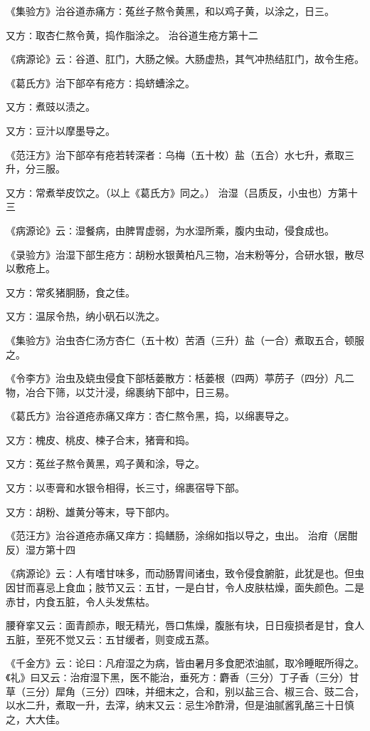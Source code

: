 \documentclass[a4paper,12pt,UTF8,twoside]{ctexbook}
\begin{document}
《集验方》治谷道赤痛方∶菟丝子熬令黄黑，和以鸡子黄，以涂之，日三。

又方∶取杏仁熬令黄，捣作脂涂之。
治谷道生疮方第十二

《病源论》云∶谷道、肛门，大肠之候。大肠虚热，其气冲热结肛门，故令生疮。

《葛氏方》治下部卒有疮方∶捣蛴螬涂之。

又方∶煮豉以渍之。

又方∶豆汁以摩墨导之。

《范汪方》治下部卒有疮若转深者∶乌梅（五十枚）盐（五合）水七升，煮取三升，分三服。

又方∶常煮举皮饮之。（以上《葛氏方》同之。）
治湿（吕质反，小虫也）方第十三

《病源论》云∶湿餐病，由脾胃虚弱，为水湿所乘，腹内虫动，侵食成也。

《录验方》治湿下部生疮方∶胡粉水银黄柏凡三物，冶末粉等分，合研水银，散尽以敷疮上。

又方∶常炙猪胴肠，食之佳。

又方∶温尿令热，纳小矾石以洗之。

《集验方》治虫杏仁汤方杏仁（五十枚）苦酒（三升）盐（一合）煮取五合，顿服之。

《令李方》治虫及蛲虫侵食下部栝蒌散方∶栝蒌根（四两）葶苈子（四分）凡二物，冶合下筛，以艾汁浸，绵裹纳下部中，日三易。

《葛氏方》治谷道疮赤痛又痒方∶杏仁熬令黑，捣，以绵裹导之。

又方∶槐皮、桃皮、楝子合末，猪膏和捣。

又方∶菟丝子熬令黄黑，鸡子黄和涂，导之。

又方∶以枣膏和水银令相得，长三寸，绵裹宿导下部。

又方∶胡粉、雄黄分等末，导下部内。

《范汪方》治谷道疮赤痛又痒方∶捣鳝肠，涂绵如指以导之，虫出。
治疳（居酣反）湿方第十四

《病源论》云∶人有嗜甘味多，而动肠胃间诸虫，致令侵食腑脏，此犹是也。但虫因甘而喜忌上食血；肢节又云∶五甘，一是白甘，令人皮肤枯燥，面失颜色。二是赤甘，内食五脏，令人头发焦枯。

腰脊挛又云∶面青颜赤，眼无精光，唇口焦燥，腹胀有块，日日瘦损者是甘，食人五脏，至死不觉又云∶五甘缓者，则变成五蒸。

《千金方》云∶论曰∶凡疳湿之为病，皆由暑月多食肥浓油腻，取冷睡眠所得之。《礼》曰又云∶治疳湿下黑，医不能治，垂死方∶麝香（三分）丁子香（三分）甘草（三分）犀角（三分）四味，并细末之，合和，别以盐三合、椒三合、豉二合，以水二升，煮取一升，去滓，纳末又云∶忌生冷酢滑，但是油腻酱乳酪三十日慎之，大大佳。
\end{document}
